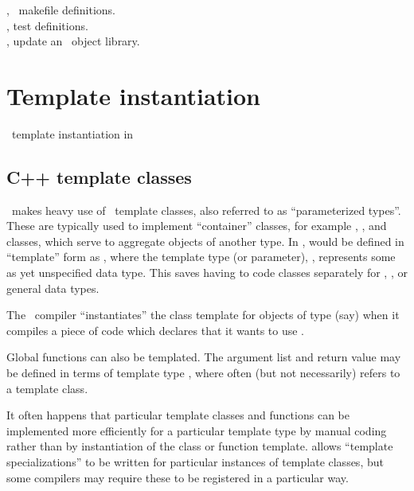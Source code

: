 , \aipspp\ makefile definitions.\\
, test  definitions.\\
, update an \aipspp\ object library.

 
\newpage
\section{Template instantiation}
\label{Template instantiation}

\cplusplus\ template instantiation in \aipspp
 
\subsection*{C++ template classes}

\aipspp\ makes heavy use of \cplusplus\ template classes, also referred to as
``parameterized types''.  These are typically used to implement ``container''
classes, for example , , and  classes, which
serve to aggregate objects of another type.  In \cplusplus,  would
be defined in ``template'' form as , where the template type (or
parameter), , represents some as yet unspecified data type.  This
saves having to code  classes separately for ,
, or general  data types. 

The \cplusplus\ compiler ``instantiates'' the  class template for
objects of type  (say) when it compiles a piece of code which
declares that it wants to use .

Global functions can also be templated.  The argument list and return value
may be defined in terms of template type , where  often (but
not necessarily) refers to a template class.

It often happens that particular template classes and functions can be
implemented more efficiently for a particular template type by manual coding
rather than by instantiation of the class or function template.  \cplusplus
allows ``template specializations'' to be written for particular instances of
template classes, but some compilers may require these to be registered in
a particular way.
 
